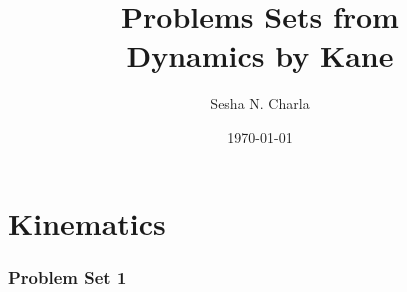 \documentclass[letterpaper, 11pt]{article}
\title{Problems Sets from\\Dynamics by Kane}
\author{Sesha N. Charla}
\date{\today}
\begin{document}
\maketitle
\tableofcontents
\newpage
\part{Kinematics}
\section{Problem Set 1}





\end{document}
